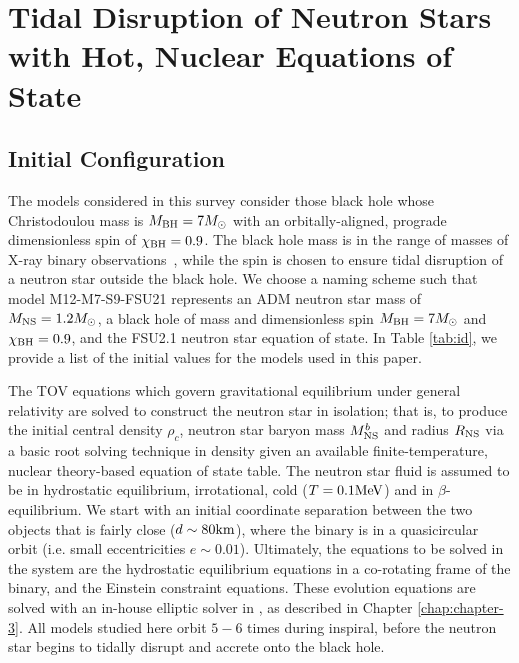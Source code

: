 \chapter{Tidal Disruption of Neutron Stars with Hot, Nuclear Equations of State}
\label{chap:chapter-5}

\section{Initial Configuration}
\label{sec:initial-config}

The models considered in this survey consider those black hole whose Christodoulou mass is $M_{\rm BH} = 7 M_\odot$ with an orbitally-aligned, prograde dimensionless spin of $\chi_{\rm BH} = 0.9$.
The black hole mass is in the range of masses of X-ray binary observations~\cite{Ozel:2010,Kreidberg:2012}, while the spin is chosen to ensure tidal disruption of a neutron star outside the black hole.
We choose a naming scheme such that model M12-M7-S9-FSU21 represents an ADM neutron star mass of $M_{\rm NS} = 1.2 M_\odot$, a black hole of mass and dimensionless spin $M_{\rm BH} = 7 M_\odot$ and $\chi_{\rm BH} = 0.9$, and the FSU2.1 neutron star equation of state.
In Table \ref{tab:id}, we provide a list of the initial values for the models used in this paper.

The TOV equations which govern gravitational equilibrium under general relativity are solved to construct the neutron star in isolation; that is, to produce the initial central density $\rho_c$, neutron star baryon mass $M^b_{\rm NS}$ and radius $R_{\rm NS}$ via a basic root solving technique in density given an available finite-temperature, nuclear theory-based equation of state table.
The neutron star fluid is assumed to be in hydrostatic equilibrium, irrotational, cold ($T = 0.1 {\rm MeV}$) and in $\beta$-equilibrium.
We start with an initial coordinate separation between the two objects that is fairly close ($d \sim 80 {\rm km}$), where the binary is in a quasicircular orbit
(i.e. small eccentricities $e \sim 0.01$).
Ultimately, the equations to be solved in the system are the hydrostatic equilibrium equations in a co-rotating frame of the binary, and the Einstein constraint equations.  
These evolution equations are solved with an in-house elliptic solver in \SpEC, as described in Chapter \ref{chap:chapter-3}.
All models studied here orbit $5 - 6$ times during inspiral, before the neutron star begins to tidally disrupt and accrete onto the black hole.

